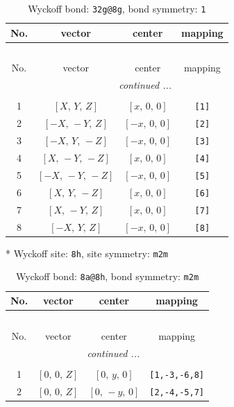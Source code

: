 \documentclass[fleqn,8pt]{jsarticle}
\begin{document}
\renewcommand{\arraystretch}{1.2}
\begin{longtable}{cccc}
\caption{Wyckoff bond: {\tt 32g@8g}, bond symmetry: {\tt 1}}
 \\
 \hline \hline
No. & vector & center & mapping \\ \hline \endfirsthead

\multicolumn{3}{l}{\tablename\ \thetable{}} \\
 \hline \hline
No. & vector & center & mapping \\ \hline \endhead

 \hline \hline
\multicolumn{3}{r}{\footnotesize\it continued ...} \\ \endfoot

 \hline \hline
\multicolumn{3}{r}{} \\ \endlastfoot

1 & $\left[ X,\, Y,\, Z \right]$ & $\left[ x,\, 0,\, 0 \right]$ & {\tt [1]} \\ \hline
2 & $\left[ - X,\, - Y,\, Z \right]$ & $\left[ - x,\, 0,\, 0 \right]$ & {\tt [2]} \\ \hline
3 & $\left[ - X,\, Y,\, - Z \right]$ & $\left[ - x,\, 0,\, 0 \right]$ & {\tt [3]} \\ \hline
4 & $\left[ X,\, - Y,\, - Z \right]$ & $\left[ x,\, 0,\, 0 \right]$ & {\tt [4]} \\ \hline
5 & $\left[ - X,\, - Y,\, - Z \right]$ & $\left[ - x,\, 0,\, 0 \right]$ & {\tt [5]} \\ \hline
6 & $\left[ X,\, Y,\, - Z \right]$ & $\left[ x,\, 0,\, 0 \right]$ & {\tt [6]} \\ \hline
7 & $\left[ X,\, - Y,\, Z \right]$ & $\left[ x,\, 0,\, 0 \right]$ & {\tt [7]} \\ \hline
8 & $\left[ - X,\, Y,\, Z \right]$ & $\left[ - x,\, 0,\, 0 \right]$ & {\tt [8]} \\
\end{longtable}
* Wyckoff site: {\tt 8h}, site symmetry: {\tt m2m}
\renewcommand{\arraystretch}{1.2}
\begin{longtable}{cccc}
\caption{Wyckoff bond: {\tt 8a@8h}, bond symmetry: {\tt m2m}}
 \\
 \hline \hline
No. & vector & center & mapping \\ \hline \endfirsthead

\multicolumn{3}{l}{\tablename\ \thetable{}} \\
 \hline \hline
No. & vector & center & mapping \\ \hline \endhead

 \hline \hline
\multicolumn{3}{r}{\footnotesize\it continued ...} \\ \endfoot

 \hline \hline
\multicolumn{3}{r}{} \\ \endlastfoot

1 & $\left[ 0,\, 0,\, Z \right]$ & $\left[ 0,\, y,\, 0 \right]$ & {\tt [1,-3,-6,8]} \\ \hline
2 & $\left[ 0,\, 0,\, Z \right]$ & $\left[ 0,\, - y,\, 0 \right]$ & {\tt [2,-4,-5,7]} \\
\end{longtable}
\end{document}
